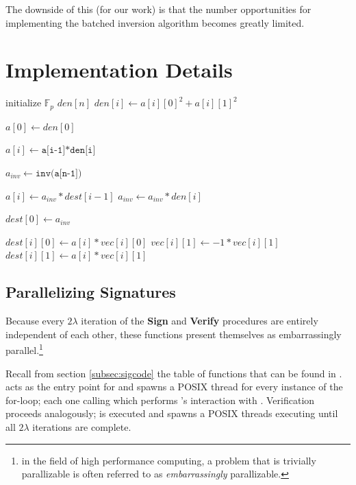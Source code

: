  The downside of this (for our work) is that the number opportunities for implementing the batched inversion algorithm becomes greatly limited.\\

\section{Implementation Details}

\begin{algorithm}
\caption{-- }\label{alg:pbmathcode}
\begin{algorithmic}[1]
\State initialize $\mathbb{F}_{p}$ $den[n]$
	\State $den[i] \gets a[i][0]^{2} + a[i][1]^{2}$
\EndFor

\State $a[0] \gets den[0]$

	\State $a[i] \gets \texttt{a[i-1]*den[i]}$
\EndFor

\State $a_{inv} \gets \texttt{inv(a[n-1])}$

	\State $a[i] \gets a_{inv}*dest[i-1]$
	\State $a_{inv} \gets a_{inv}*den[i]$
\EndFor

\State $dest[0] \gets a_{inv}$

	\State $dest[i][0] \gets a[i]*vec[i][0]$
	\State $vec[i][1] \gets -1*vec[i][1]$
	\State $dest[i][1] \gets a[i]*vec[i][1]$
\EndFor
\EndProcedure
\end{algorithmic}
\end{algorithm}

\subsection{Parallelizing Signatures}

Because every $2\lambda$ iteration of the \textbf{Sign} and \textbf{Verify} procedures are entirely independent of each other, these functions present themselves as embarrassingly parallel.\footnote{in the field of high performance computing, a problem that is trivially parallizable is often referred to as \emph{embarrassingly} parallizable.} 

Recall from section \ref{subsec:sigcode} the table of functions that can be found in .  acts as the entry point for  and spawns a POSIX thread for every instance of the for-loop; each one calling  which performs \bob's interaction with \randall. Verification proceeds analogously;  is executed and spawns a POSIX threads executing  until all $2\lambda$ iterations are complete.

